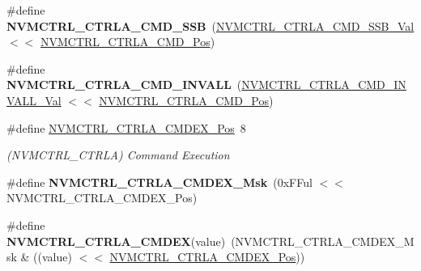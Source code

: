 \begin{DoxyCompactItemize}
\item 
\hypertarget{group___s_a_m_l21___n_v_m_c_t_r_l_ga7c3505981ea288eb37c268fbe5320d36}{}\#define {\bfseries N\+V\+M\+C\+T\+R\+L\+\_\+\+C\+T\+R\+L\+A\+\_\+\+C\+M\+D\+\_\+\+S\+S\+B}~(\hyperlink{group___s_a_m_l21___n_v_m_c_t_r_l_ga9192307a9292a8144f18adfe8ea0d3f0}{N\+V\+M\+C\+T\+R\+L\+\_\+\+C\+T\+R\+L\+A\+\_\+\+C\+M\+D\+\_\+\+S\+S\+B\+\_\+\+Val}     $<$$<$ \hyperlink{group___s_a_m_l21___n_v_m_c_t_r_l_ga5346c6f8ba695f7cadb7f07bde6e25f8}{N\+V\+M\+C\+T\+R\+L\+\_\+\+C\+T\+R\+L\+A\+\_\+\+C\+M\+D\+\_\+\+Pos})\label{group___s_a_m_l21___n_v_m_c_t_r_l_ga7c3505981ea288eb37c268fbe5320d36}

\item 
\hypertarget{group___s_a_m_l21___n_v_m_c_t_r_l_gafdd1495fff0fe785746334cb2b902409}{}\#define {\bfseries N\+V\+M\+C\+T\+R\+L\+\_\+\+C\+T\+R\+L\+A\+\_\+\+C\+M\+D\+\_\+\+I\+N\+V\+A\+L\+L}~(\hyperlink{group___s_a_m_l21___n_v_m_c_t_r_l_ga0bef792b0234a40587a3dd7254e1764d}{N\+V\+M\+C\+T\+R\+L\+\_\+\+C\+T\+R\+L\+A\+\_\+\+C\+M\+D\+\_\+\+I\+N\+V\+A\+L\+L\+\_\+\+Val}  $<$$<$ \hyperlink{group___s_a_m_l21___n_v_m_c_t_r_l_ga5346c6f8ba695f7cadb7f07bde6e25f8}{N\+V\+M\+C\+T\+R\+L\+\_\+\+C\+T\+R\+L\+A\+\_\+\+C\+M\+D\+\_\+\+Pos})\label{group___s_a_m_l21___n_v_m_c_t_r_l_gafdd1495fff0fe785746334cb2b902409}

\item 
\hypertarget{group___s_a_m_l21___n_v_m_c_t_r_l_ga6ac235db7c8301778321fa6898c7f490}{}\#define \hyperlink{group___s_a_m_l21___n_v_m_c_t_r_l_ga6ac235db7c8301778321fa6898c7f490}{N\+V\+M\+C\+T\+R\+L\+\_\+\+C\+T\+R\+L\+A\+\_\+\+C\+M\+D\+E\+X\+\_\+\+Pos}~8\label{group___s_a_m_l21___n_v_m_c_t_r_l_ga6ac235db7c8301778321fa6898c7f490}

\begin{DoxyCompactList}\small\item\em (N\+V\+M\+C\+T\+R\+L\+\_\+\+C\+T\+R\+L\+A) Command Execution \end{DoxyCompactList}\item 
\hypertarget{group___s_a_m_l21___n_v_m_c_t_r_l_gad40754e7ab3d73ad07b2fca0c4ca8de3}{}\#define {\bfseries N\+V\+M\+C\+T\+R\+L\+\_\+\+C\+T\+R\+L\+A\+\_\+\+C\+M\+D\+E\+X\+\_\+\+Msk}~(0x\+F\+Ful $<$$<$ N\+V\+M\+C\+T\+R\+L\+\_\+\+C\+T\+R\+L\+A\+\_\+\+C\+M\+D\+E\+X\+\_\+\+Pos)\label{group___s_a_m_l21___n_v_m_c_t_r_l_gad40754e7ab3d73ad07b2fca0c4ca8de3}

\item 
\hypertarget{group___s_a_m_l21___n_v_m_c_t_r_l_ga9e234ce19fc870b1be42fad5a7183220}{}\#define {\bfseries N\+V\+M\+C\+T\+R\+L\+\_\+\+C\+T\+R\+L\+A\+\_\+\+C\+M\+D\+E\+X}(value)~(N\+V\+M\+C\+T\+R\+L\+\_\+\+C\+T\+R\+L\+A\+\_\+\+C\+M\+D\+E\+X\+\_\+\+Msk \& ((value) $<$$<$ \hyperlink{group___s_a_m_l21___n_v_m_c_t_r_l_ga6ac235db7c8301778321fa6898c7f490}{N\+V\+M\+C\+T\+R\+L\+\_\+\+C\+T\+R\+L\+A\+\_\+\+C\+M\+D\+E\+X\+\_\+\+Pos}))\label{group___s_a_m_l21___n_v_m_c_t_r_l_ga9e234ce19fc870b1be42fad5a7183220}


\end{DoxyCompactItemize}
